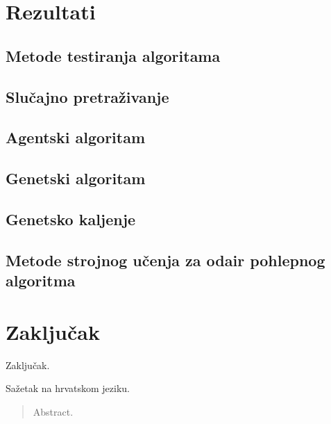 \documentclass[times, utf8, diplomski, numeric]{fer}
\begin{document}
\chapter{Rezultati}
\section{Metode testiranja algoritama}
\section{Slučajno pretraživanje}
\section{Agentski algoritam}

\section{Genetski algoritam}
\section{Genetsko kaljenje}

\section{Metode strojnog učenja za odair pohlepnog algoritma}

\chapter{Zaključak}
Zaključak.




\begin{sazetak}
Sažetak na hrvatskom jeziku.

\end{sazetak}

\begin{abstract}
Abstract.

\end{abstract}
\end{document}
